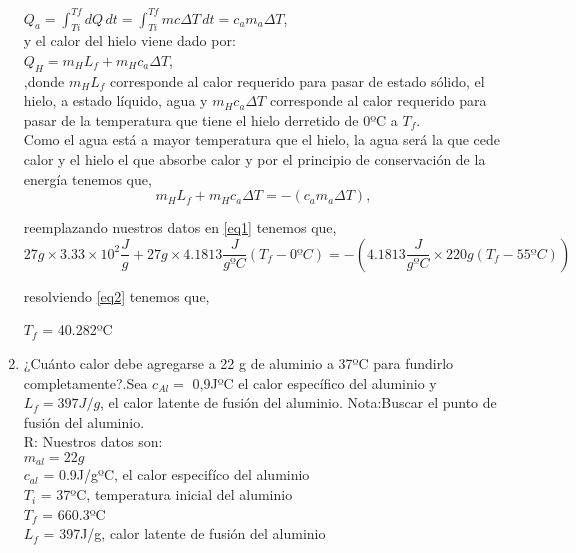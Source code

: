 \documentclass[a4paper, 12p]{article}
\begin{document}
\begin{enumerate}
		     $Q_{a} = \int_{Ti}^{Tf} \!dQ \, dt  = \int_{Ti}^{Tf} \! mc \Delta T \, dt = c_{a} m_{a} \Delta T $, \\ 
		     
		     y el calor del hielo viene dado por:\\ 
		     
		     $Q_{H} = m_{H}L_{f} + m_{H}c_{a} \Delta T $,\\
		     
		     ,donde $m_{H}L_{f}$ corresponde al calor requerido para pasar de estado sólido, el hielo, a estado líquido, agua y $m_{H}c_{a} \Delta T$ corresponde al calor requerido para pasar de la temperatura que tiene el hielo derretido de 0ºC a $T_{f}$.\\
		     
		     Como el agua está a mayor temperatura que el hielo, la agua será la que cede calor y el hielo el que absorbe calor y por el principio de conservación de la energía tenemos que,\\
		     \begin{equation}\label{eq1}
		     m_{H}L_{f} + m_{H}c_{a} \Delta T = -(c_{a} m_{a} \Delta T),
		     \end{equation} 
		     
		     reemplazando nuestros datos en \ref{eq1} tenemos que,
		     \begin{equation}\label{eq2}
		     27 g \times 3.33 \times 10^2\dfrac{J}{g} + 27 g \times 4.1813\dfrac{J}{gºC}(T_{f} - 0ºC) = -(4.1813\dfrac{J}{gºC} \times 220 g(T_{f} - 55ºC))
		     \end{equation}
		     
		     resolviendo \ref{eq2} tenemos que,
		     
		     $T_{f}$ = 40.282ºC
		     
		  \item ¿Cuánto calor debe agregarse a 22 g de aluminio a 37ºC para fundirlo completamente?.Sea $c_{Al} =$ 0,9JºC el calor específico del aluminio y $L_{f} = 397J/g$, el calor latente de fusión del aluminio.
Nota:Buscar el punto de fusión del aluminio.\\
		  R: Nuestros datos son:\\
		  
		     $m_{al} = 22g$ \\
		     $c_{al}$ = 0.9J/gºC, el calor especifíco del aluminio \\
		     $T_{i}$ = 37ºC, temperatura inicial del aluminio \\
		     $T_{f}$ = 660.3ºC \\
		     $L_{f}$ = 397J/g, calor latente de fusión del aluminio \\  
		     

\end{enumerate}
\end{document}
